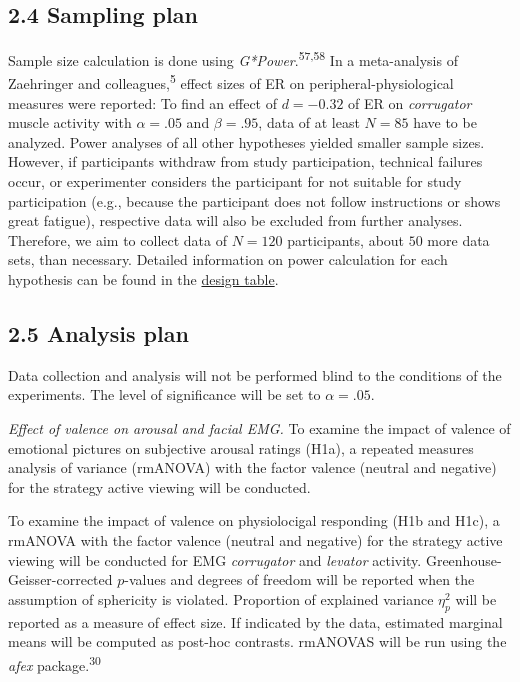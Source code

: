 \documentclass[
  english,
  man,floatsintext]{apa6}
\begin{document}
\hypertarget{sampling-plan}{%
\subsection{2.4 Sampling plan}\label{sampling-plan}}

Sample size calculation is done using \emph{G*Power}.\textsuperscript{57,58}
In a meta-analysis of Zaehringer and colleagues,\textsuperscript{5} effect sizes of ER on peripheral-physiological measures were reported:
To find an effect of \(d=-0.32\) of ER on \emph{corrugator} muscle activity with \(\alpha=.05\) and \(\beta=.95\), data of at least \(N=85\) have to be analyzed.
Power analyses of all other hypotheses yielded smaller sample sizes.
However, if participants withdraw from study participation, technical failures occur, or experimenter considers the participant for not suitable for study participation (e.g., because the participant does not follow instructions or shows great fatigue), respective data will also be excluded from further analyses.
Therefore, we aim to collect data of \(N=120\) participants, about \(50%
\) more data sets, than necessary.
Detailed information on power calculation for each hypothesis can be found in the \protect\hyperlink{DesignTable}{design table}.

\hypertarget{analysis-plan}{%
\subsection{2.5 Analysis plan}\label{analysis-plan}}

Data collection and analysis will not be performed blind to the conditions of the experiments.
The level of significance will be set to \(\alpha=.05\).

\emph{Effect of valence on arousal and facial EMG.}
To examine the impact of valence of emotional pictures on subjective arousal ratings (H1a), a repeated measures analysis of variance (rmANOVA) with the factor valence (neutral and negative) for the strategy active viewing will be conducted.

To examine the impact of valence on physiolocigal responding (H1b and H1c), a rmANOVA with the factor valence (neutral and negative) for the strategy active viewing will be conducted for EMG \emph{corrugator} and \emph{levator} activity.
Greenhouse-Geisser-corrected \(p\)-values and degrees of freedom will be reported when the assumption of sphericity is violated.
Proportion of explained variance \(\eta_{p}^{2}\) will be reported as a measure of effect size.
If indicated by the data, estimated marginal means will be computed as post-hoc contrasts.
rmANOVAS will be run using the \emph{afex} package.\textsuperscript{30}
\end{document}
